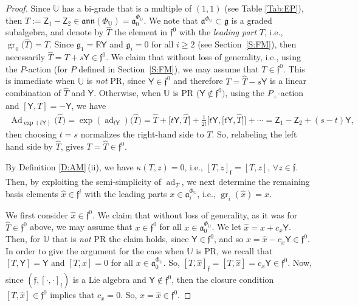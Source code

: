 \documentclass[10pt,a4paper]{amsart}
\DeclareMathOperator{\gr}{gr}
\newcommand{\g}{\mathfrak{g}}
\newcommand\ad{\operatorname{ad}}
\newcommand\Ad{\operatorname{Ad}}
\renewcommand\gr{\operatorname{gr}}
\newcommand\fa{\mathfrak{a}}
\newcommand\fann{\mathfrak{ann}}
\newcommand\ff{\mathfrak{f}}
\newcommand{\R}{\mathbb{R}}
\newcommand\bbU{\mathbb{U}}
\newcommand\sfY{\mathsf{Y}}
\newcommand\sfZ{\mathsf{Z}}
\numberwithin{equation}{section}
\begin{document}
 \begin{proof}
 Since $\bbU$ has a bi-grade that is a multiple of $(1,1)$ (see Table \ref{Tab:EP}), then $ T:=\sfZ_1 -\sfZ_2 \in \fann (\Phi_{\bbU})=\fa^{\Phi_\bbU}_0$. We note that $\fa^{\Phi_\bbU} \subset \g$ is a graded subalgebra, and denote by $\widehat{T}$ the element in $\ff^0$ with the {\em leading part} $T$, i.e., $\gr_0\bigl(\widehat{T}\bigr) = T$. Since $\g_1 = \R \sfY$ and $\g_i = 0$ for all $i \ge 2$ (see Section~\ref{S:FM}), then necessarily $\widehat{T}= T + s \sfY \in \ff^0$. We claim that without loss of generality, i.e., using the $P$-action (for $P$ defined in Section~\ref{S:FM}), we may assume that $T \in \ff^0$. This is immediate when $\bbU$ is {\em not} PR, since $\sfY \in \ff^0$ and therefore $T= \widehat{T}-s\sfY$ is a linear combination of $\widehat{T}$ and $\sfY$. Otherwise, when $\bbU$ is PR $\bigl(\sfY \not\in \ff^0\bigr)$, using the $P_{+}$-action and $[\sfY, T] = -\sfY$, we have
 \begin{align*}
\Ad_{\exp(t\sfY)}\bigl(\widehat{T}\bigr) = \exp(\ad_{t\sfY})\bigl(\widehat{T}\bigr)= \widehat{T} + \big[t\sfY,\widehat{T}\big]+ \frac{1}{2!}\big[t\sfY,\big[t\sfY, \widehat{T}\big]\big] + \cdots= \sfZ_1 - \sfZ_2 + (s-t)\sfY,
 \end{align*}
 then choosing $t=s$ normalizes the right-hand side to $T$. So, relabeling the left hand side by $\widehat{T}$, gives $T = \widehat{T} \in \ff^0$.

By Definition \ref{D:AM}\,(ii), we have
$\kappa(T, z) = 0$, i.e., $[T, z]_\ff = [T, z]$, $\forall z \in \ff$.
Then, by exploiting the semi-simplicity of $\ad_T$, we next determine the remaining basis elements $\widehat{x} \in \ff^i$ with the leading parts $x \in \fa^{\Phi_\bbU}_i$, i.e., $\gr_i(\widehat{x}) = x$.

We first consider $\widehat{x} \in \ff^0$. We claim that without loss of generality, as it was for $\widehat{T} \in \ff^0$ above, we may assume that $x \in \ff^0$ for all $x \in \fa^{\Phi_\bbU}_0$. We let $\widehat{x} = x + c_x \sfY$. Then, for $\bbU$ that is {\em not} PR the claim holds, since $\sfY \in \ff^0$, and so $x = \widehat{x}-c_x\sfY \in \ff^0$. In order to give the argument for the case when $\bbU$ is PR, we recall that $[T, \sfY] = \sfY$ and $[T, x] = 0$ for all $x \in \fa_0^{\Phi_\bbU}$. So, $[T, \widehat{x}]_\ff =[T, \widehat{x}] = c_x \sfY \in \ff^0$. Now, since $(\ff, [\cdot, \cdot]_\ff)$ is a Lie algebra and $\sfY \not \in \ff^0$, then the closure condition $[T, \widehat{x}] \in \ff^0$ implies that $c_x = 0$. So, $x = \widehat{x} \in \ff^0$.


\end{proof}
\end{document}
